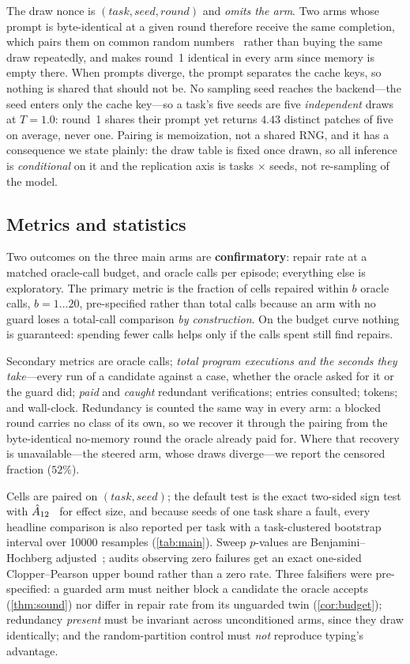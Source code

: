 The draw nonce is $(\textit{task}, \textit{seed}, \textit{round})$ and
\emph{omits the arm}. Two arms whose prompt is byte-identical at a given round
therefore receive the same completion, which pairs them on common random
numbers~\cite{law2000simulation} rather than buying the same draw repeatedly,
and makes round~1 identical in every arm since memory is empty there. When
prompts diverge, the prompt separates the cache keys, so nothing is shared that
should not be. No sampling seed reaches the backend---the seed enters only the
cache key---so a task's five seeds are five \emph{independent} draws at
$T = 1.0$: round~1 shares their prompt yet returns $4.43$ distinct patches of
five on average, never one. Pairing is memoization, not a shared RNG, and it
has a consequence we state plainly: the draw table is fixed once drawn, so all
inference is \emph{conditional} on it and the replication axis is tasks
$\times$ seeds, not re-sampling of the model.

\subsection{Metrics and statistics}
Two outcomes on the three main arms are \textbf{confirmatory}: repair rate at a
matched oracle-call budget, and oracle calls per episode; everything else is
exploratory. The primary metric is the fraction of cells repaired within $b$
oracle calls, $b = 1 \dots 20$, pre-specified rather than total calls because
an arm with no guard loses a total-call comparison \emph{by construction}. On
the budget curve nothing is guaranteed: spending fewer calls helps only if the
calls spent still find repairs.

Secondary metrics are oracle calls; \emph{total program executions and the
seconds they take}---every run of a candidate against a case, whether the
oracle asked for it or the guard did; \emph{paid} and \emph{caught} redundant
verifications; entries consulted; tokens; and wall-clock. Redundancy is counted
the same way in every arm: a blocked round carries no class of its own, so we
recover it through the pairing from the byte-identical no-memory round the
oracle already paid for. Where that recovery is unavailable---the steered arm,
whose draws diverge---we report the censored fraction ($52\%$).

Cells are paired on $(\textit{task}, \textit{seed})$; the default test is the
exact two-sided sign test with $\hat{A}_{12}$~\cite{vargha2000effect} for effect
size, and because seeds of one task share a fault, every headline comparison is
also reported per task with a task-clustered bootstrap interval over
\num{10000} resamples (\cref{tab:main}). Sweep $p$-values are
Benjamini--Hochberg
adjusted~\cite{benjamini1995fdr}; audits observing zero failures get an exact
one-sided Clopper--Pearson upper bound rather than a zero rate. Three
falsifiers were pre-specified: a guarded arm must neither block a candidate
the oracle accepts (\cref{thm:sound}) nor differ in repair rate from its
unguarded twin (\cref{cor:budget}); redundancy \emph{present} must be
invariant across unconditioned arms, since they draw identically; and the
random-partition control must \emph{not} reproduce typing's advantage.
